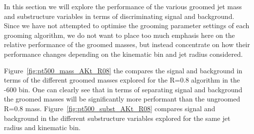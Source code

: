 In this section we will explore the performance of the various groomed
jet mass and substructure variables in terms of discriminating signal
and background.
Since we
have not attempted to optimise the grooming parameter settings of
each grooming algorithm, we do not want to place too much emphasis
here on the relative performance of the groomed masses, but instead
concentrate on how their performance changes depending on the
kinematic bin and jet radius considered. 

Figure~\ref{fig:pt500_mass_AKt_R08} the compares the signal and
background in terms of the different groomed masses explored for the
\antikt R=0.8 algorithm in the -600 bin. One can clearly see
that in terms of separating signal and background the groomed masses
will be significantly more performant than the ungroomed \antikt R=0.8
mass.
Figure~\ref{fig:pt500_subst_AKt_R08}
compares signal and background in the different substructure variables
explored for the same jet radius and kinematic bin. 

